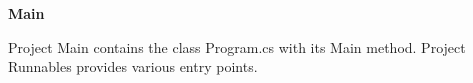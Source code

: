 

\cfoot{\thepage}								      %
\renewcommand{\headrulewidth}{0.0cm}			%
\renewcommand{\footrulewidth}{0.0cm}			%
\lstset{language=[Sharp]C,basicstyle=\small\sffamily}



\begin{center}
   \textbf{\LARGE{Main}}\\[0.25cm]
\end{center}

Project Main contains the class Program.cs with its Main method. Project Runnables provides various entry points.



